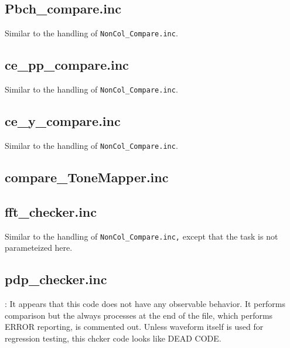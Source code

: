 \documentclass{note}
\begin{document}
\subsection{Pbch\_compare.inc}
\bit
\w Similar to the handling of \verb+NonCol_Compare.inc+.
\eit

\subsection{ce\_pp\_compare.inc}
\bit
\w Similar to the handling of \verb+NonCol_Compare.inc+.
\eit

\subsection{ce\_y\_compare.inc}
\bit
\w Similar to the handling of \verb+NonCol_Compare.inc+.
\eit

\subsection{compare\_ToneMapper.inc}
\bit
\w 
\eit

\subsection{fft\_checker.inc}
\bit
\w Similar to the handling of \verb+NonCol_Compare.inc,+ except that the task
is not parameteized here.
\eit

\subsection{pdp\_checker.inc}
\bit
\w \textcolor{red2}{: It appears that this code does not have any
  observable behavior. It performs comparison but the always processes at the
  end of the file, which performs ERROR reporting, is commented out. Unless
  waveform itself is used for regression testing, this chcker code looks like
  DEAD CODE.} 
\eit
\end{document}
